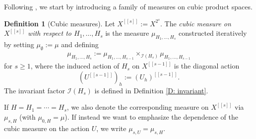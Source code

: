\documentclass[11pt]{amsart}
\theoremstyle{definition}
\newtheorem{definition}[lemma]{Definition}
\newcommand{\CI}{{\mathcal I}}
\newcommand{\cube}[1]{{[\![#1]\!]}}
\newcommand{\1}{{\mathbf{1}}}
\begin{document}
Following \cite{H09, HK05a, HK18}, we start by introducing a family of measures on cubic product spaces.
\begin{definition}[Cubic measures]\label{D: cubic measures}
Let $X^{\cube{s}}:=X^{2^s}$. The \textit{cubic measure on $X^{\cube{s}}$ with respect to $H_1, \ldots, H_s$} is the measure $\mu_{H_1, \ldots, H_s}$ constructed iteratively by setting $\mu_{\emptyset}:=\mu$ and defining 
\begin{align*}
    \mu_{H_1, \ldots, H_s} := \mu_{H_1, \ldots, H_{s-1}}\times_{\CI(H_{s})} \mu_{H_1, \ldots, H_{s-1}}
\end{align*}
for $s\geq 1$,
where the induced action of $H_s$ on $X^{\cube{s-1}}$ is the diagonal action $$(U^\cube{s-1})_h:=(U_h)^\cube{s-1}.$$  The invariant factor $\CI(H_s)$ is defined in Definition \ref{D: invariant}.

If $H=H_1 = \cdots = H_s$, we also denote the corresponding measure on $X^{\cube{s}}$ via $\mu_{s,H}$ (with $\mu_{0,H} = \mu$). If instead we want to emphasize the dependence of the cubic measure on the action $U$, we write $\mu_{s,U} = \mu_{s,H}$.
\end{definition}
\end{document}
